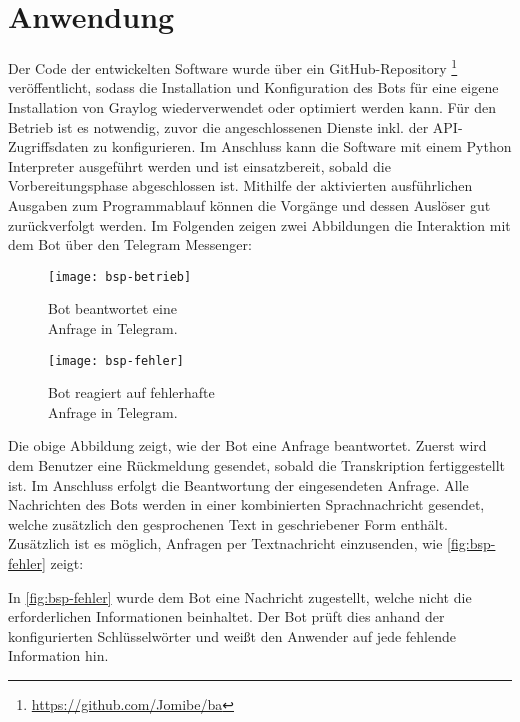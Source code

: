 \section{Anwendung}

Der Code der entwickelten Software wurde über ein GitHub-Repository \footnote{\url{https://github.com/Jomibe/ba}} veröffentlicht, sodass die Installation und Konfiguration des Bots für eine eigene Installation von Graylog wiederverwendet oder optimiert werden kann. Für den Betrieb ist es notwendig, zuvor die angeschlossenen Dienste inkl. der API-Zugriffsdaten zu konfigurieren. Im Anschluss kann die Software mit einem Python Interpreter ausgeführt werden und ist einsatzbereit, sobald die Vorbereitungsphase abgeschlossen ist. Mithilfe der aktivierten ausführlichen Ausgaben zum Programmablauf können die Vorgänge und dessen Auslöser gut zurückverfolgt werden. Im Folgenden zeigen zwei Abbildungen die Interaktion mit dem Bot über den Telegram Messenger:

\begin{figure}[h!]
    \centering
    \begin{minipage}{0.5\textwidth}
        \raggedright
        \texttt{[image: bsp-betrieb]}
        \caption{Bot beantwortet eine \\\hspace{\textwidth}Anfrage in Telegram.}
        \label{fig:bsp-betrieb}
    \end{minipage}\hfill
    \begin{minipage}{0.5\textwidth}
        \raggedleft
        \texttt{[image: bsp-fehler]}
        \caption{Bot reagiert auf fehlerhafte \\\hspace{\textwidth}Anfrage in Telegram.}
        \label{fig:bsp-fehler}
    \end{minipage}
\end{figure}

Die obige Abbildung zeigt, wie der Bot eine Anfrage beantwortet. Zuerst wird dem Benutzer eine Rückmeldung gesendet, sobald die Transkription fertiggestellt ist. Im Anschluss erfolgt die Beantwortung der eingesendeten Anfrage. Alle Nachrichten des Bots werden in einer kombinierten Sprachnachricht gesendet, welche zusätzlich den gesprochenen Text in geschriebener Form enthält. Zusätzlich ist es möglich, Anfragen per Textnachricht einzusenden, wie \autoref{fig:bsp-fehler} zeigt:

In \autoref{fig:bsp-fehler} wurde dem Bot eine Nachricht zugestellt, welche nicht die erforderlichen Informationen beinhaltet. Der Bot prüft dies anhand der konfigurierten Schlüsselwörter und weißt den Anwender auf jede fehlende Information hin. 


